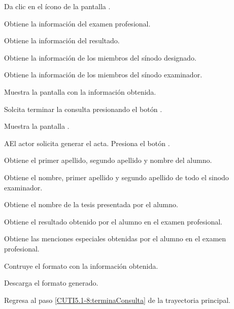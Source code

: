 \begin{UCtrayectoria}
	
	\UCpaso[\UCactor] Da clic en el ícono \btnVer de la pantalla .
	
	\UCpaso[\UCsist] Obtiene la información del examen profesional.
	
	\UCpaso[\UCsist] Obtiene la información del resultado.
	
	\UCpaso[\UCsist] Obtiene la información de los miembros del sínodo designado.
	
	\UCpaso[\UCsist] Obtiene la información de los miembros del sínodo examinador.
	
	\UCpaso[\UCsist] Muestra la pantalla  con la información obtenida.
	
	\UCpaso[\UCactor] Solcita terminar la consulta presionando el botón .  \label{CUTI5.1-8:terminaConsulta}
	
	\UCpaso[\UCsist] Muestra la pantalla .
	
\end{UCtrayectoria}


\begin{UCtrayectoriaA}{A}{El actor solicita generar el acta.}
	\UCpaso[\UCactor] Presiona el botón .
	
	\UCpaso[\UCsist] Obtiene el primer apellido, segundo apellido y nombre del alumno.
	
	\UCpaso[\UCsist] Obtiene el nombre, primer apellido y segundo apellido de todo el sinodo examinador.

	\UCpaso[\UCsist] Obtiene el nombre de la tesis presentada por el alumno.
	
	\UCpaso[\UCsist] Obtiene el resultado obtenido por el alumno en el examen profesional.
	
	\UCpaso[\UCsist] Obtiene las menciones especiales obtenidas por el alumno en el examen profesional.
	
	\UCpaso[\UCsist] Contruye el formato  con la información obtenida.
	
	\UCpaso[\UCsist] Descarga el formato generado.
			
	\UCpaso[] Regresa al paso \ref{CUTI5.1-8:terminaConsulta} de la trayectoria principal.
	
\end{UCtrayectoriaA}
